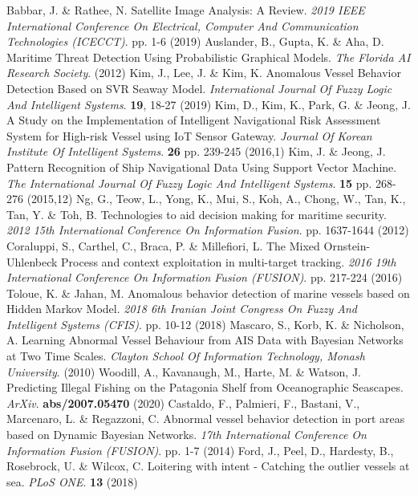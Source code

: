 Babbar, J. \& Rathee, N. Satellite Image Analysis: A Review. {\em 2019 IEEE International Conference On Electrical, Computer And Communication Technologies (ICECCT)}. pp. 1-6 (2019)
Auslander, B., Gupta, K. \& Aha, D. Maritime Threat Detection Using Probabilistic Graphical Models. {\em The Florida AI Research Society}. (2012)
Kim, J., Lee, J. \& Kim, K. Anomalous Vessel Behavior Detection Based on SVR Seaway Model. {\em International Journal Of Fuzzy Logic And Intelligent Systems}. \textbf{19}, 18-27 (2019)
Kim, D., Kim, K., Park, G. \& Jeong, J. A Study on the Implementation of Intelligent Navigational Risk Assessment System for High-risk Vessel using IoT Sensor Gateway. {\em Journal Of Korean Institute Of Intelligent Systems}. \textbf{26} pp. 239-245 (2016,1)
Kim, J. \& Jeong, J. Pattern Recognition of Ship Navigational Data Using Support Vector Machine. {\em The International Journal Of Fuzzy Logic And Intelligent Systems}. \textbf{15} pp. 268-276 (2015,12)
Ng, G., Teow, L., Yong, K., Mui, S., Koh, A., Chong, W., Tan, K., Tan, Y. \& Toh, B. Technologies to aid decision making for maritime security. {\em 2012 15th International Conference On Information Fusion}. pp. 1637-1644 (2012)
Coraluppi, S., Carthel, C., Braca, P. \& Millefiori, L. The Mixed Ornstein-Uhlenbeck Process and context exploitation in multi-target tracking. {\em 2016 19th International Conference On Information Fusion (FUSION)}. pp. 217-224 (2016)
Toloue, K. \& Jahan, M. Anomalous behavior detection of marine vessels based on Hidden Markov Model. {\em 2018 6th Iranian Joint Congress On Fuzzy And Intelligent Systems (CFIS)}. pp. 10-12 (2018)
Mascaro, S., Korb, K. \& Nicholson, A. Learning Abnormal Vessel Behaviour from AIS Data with Bayesian Networks at Two Time Scales. {\em Clayton School Of Information Technology, Monash University}. (2010)
Woodill, A., Kavanaugh, M., Harte, M. \& Watson, J. Predicting Illegal Fishing on the Patagonia Shelf from Oceanographic Seascapes. {\em ArXiv}. \textbf{abs/2007.05470} (2020)
Castaldo, F., Palmieri, F., Bastani, V., Marcenaro, L. \& Regazzoni, C. Abnormal vessel behavior detection in port areas based on Dynamic Bayesian Networks. {\em 17th International Conference On Information Fusion (FUSION)}. pp. 1-7 (2014)
Ford, J., Peel, D., Hardesty, B., Rosebrock, U. \& Wilcox, C. Loitering with intent - Catching the outlier vessels at sea. {\em PLoS ONE}. \textbf{13} (2018)
